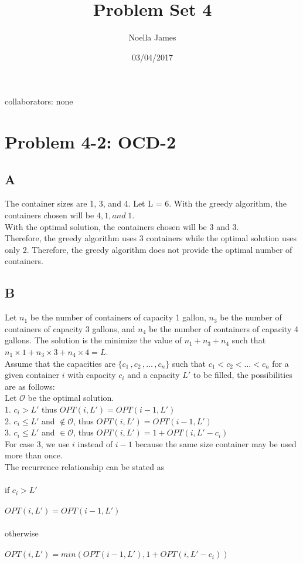 \documentclass{article}
\theoremstyle{definition}
\theoremstyle{remark}
\theoremstyle{plain}
\begin{document}
\title{Problem Set 4}
\date{03/04/2017}
\author{Noella James}
\maketitle
collaborators: none\\

\section*{Problem 4-2: OCD-2}

\subsection*{A}
The container sizes are 1, 3, and 4.
Let L = 6.
With the greedy algorithm, the containers chosen will be $4, 1, and\; 1$.\\
With the optimal solution, the containers chosen will be 3 and 3. \\
Therefore, the greedy algorithm uses 3 containers while the optimal solution uses only 2. Therefore, the greedy algorithm does not provide the optimal number of containers.\\

\subsection*{B}
Let $n_1$ be the number of containers of capacity 1 gallon, $n_3$ be the number of containers of capacity 3 gallons, and $n_4$ be the number of containers of capacity 4 gallons. The solution is the minimize the value of $n_1 + n_3 + n_4$ such that $n_1 \times 1 + n_3 \times 3 + n_4 \times 4 = L$.\\
Assume that the capacities are $\{c_1\,,c_2\,,\ldots\,,c_n\}$ such that $c_1 < c_2 < \ldots < c_n$ for a given container $i$ with capacity $c_i$ and a capacity $L'$ to be filled, the possibilities are as follows:\\
Let $\mathcal{O}$ be the optimal solution.\\
1. $c_i > L'$ thus $OPT(i, L') = OPT(i-1, L')$\\
2. $c_i \leq L'$ and $\notin \mathcal{O}$, thus $OPT(i, L') = OPT(i-1, L')$\\
3. $c_i \leq L'$ and $\in \mathcal{O}$, thus $OPT(i, L') = 1 + OPT(i, L' - c_i)$\\
For case 3, we use $i$ instead of $i-1$ because the same size container may be used more than once.\\
The recurrence relationship can be stated as \\\\
if $c_i > L'$ \\\\
$OPT(i, L') = OPT(i-1, L')$\\\\
otherwise\\\\
$OPT(i, L') = min(OPT(i-1, L'), 1 + OPT(i, L' - c_i))$\\
\end{document}
